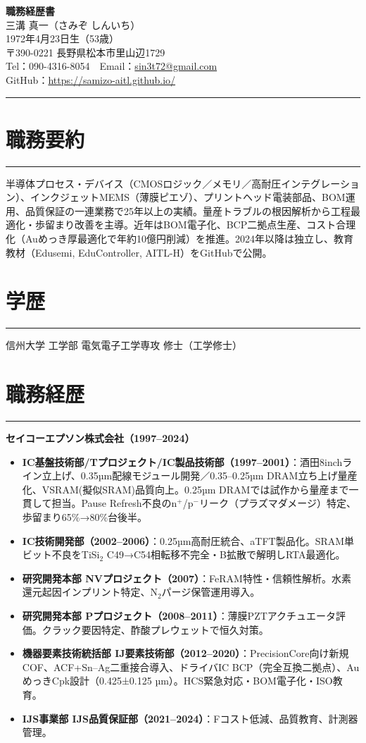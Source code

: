 \documentclass[lualatex,ja=standard,11pt]{bxjsarticle}
\newcommand{\cvsection}[1]{\section*{#1}\vspace{-0.3em}\hrule\vspace{0.5em}}
\begin{document}
\begin{center}
{\Huge \textbf{職務経歴書}} \\[1.2em]
{\Large 三溝 真一（さみぞ しんいち）} \\[0.5em]
1972年4月23日生（53歳） \\[0.3em]
〒390-0221 長野県松本市里山辺1729 \\[0.3em]
Tel：090-4316-8054　Email：\href{mailto:sin3t72@gmail.com}{sin3t72@gmail.com} \\[0.3em]
GitHub：\href{https://samizo-aitl.github.io/}{https://samizo-aitl.github.io/}
\end{center}

\vspace{1em}
\hrule
\vspace{1em}

\cvsection{職務要約}
半導体プロセス・デバイス（CMOSロジック／メモリ／高耐圧インテグレーション）、インクジェットMEMS（薄膜ピエゾ）、プリントヘッド電装部品、BOM運用、品質保証の一連業務で25年以上の実績。量産トラブルの根因解析から工程最適化・歩留まり改善を主導。近年はBOM電子化、BCP二拠点生産、コスト合理化（Auめっき厚最適化で年約10億円削減）を推進。2024年以降は独立し、教育教材（Edusemi, EduController, AITL-H）をGitHubで公開。

\cvsection{学歴}
信州大学 工学部 電気電子工学専攻 修士（工学修士）

\cvsection{職務経歴}
\textbf{セイコーエプソン株式会社（1997–2024）}

\begin{itemize}
  \item \textbf{IC基盤技術部/Tプロジェクト/IC製品技術部（1997–2001）}：酒田8inchライン立上げ、0.35µm配線モジュール開発／0.35–0.25µm DRAM立ち上げ量産化、VSRAM(擬似SRAM)品質向上。0.25µm DRAMでは試作から量産まで一貫して担当。Pause Refresh不良のn$^+$/p$^-$リーク（プラズマダメージ）特定、歩留まり65\%→80\%台後半。
  \item \textbf{IC技術開発部（2002–2006）}：0.25µm高耐圧統合、aTFT製品化。SRAM単ビット不良をTiSi$_2$ C49→C54相転移不完全・B拡散で解明しRTA最適化。
  \item \textbf{研究開発本部 NVプロジェクト（2007）}：FeRAM特性・信頼性解析。水素還元起因インプリント特定、N$_2$パージ保管運用導入。
  \item \textbf{研究開発本部 Pプロジェクト（2008–2011）}：薄膜PZTアクチュエータ評価。クラック要因特定、酢酸プレウェットで恒久対策。
  \item \textbf{機器要素技術統括部 IJ要素技術部（2012–2020）}：PrecisionCore向け新規COF、ACF+Sn–Ag二重接合導入、ドライバIC BCP（完全互換二拠点）、AuめっきCpk設計（0.425±0.125 µm）。HCS緊急対応・BOM電子化・ISO教育。
  \item \textbf{IJS事業部 IJS品質保証部（2021–2024）}：Fコスト低減、品質教育、計測器管理。
\end{itemize}
\end{document}
